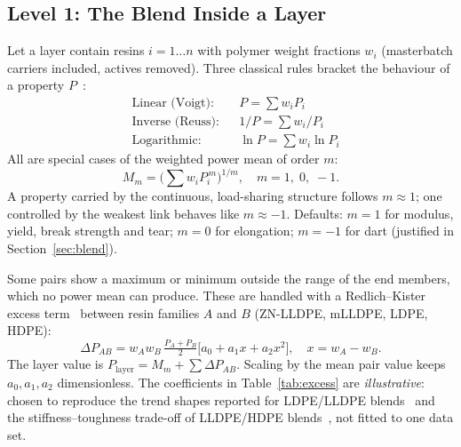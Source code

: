 \documentclass[conference,a4paper]{IEEEtran}
\begin{document}
\subsection{Level 1: The Blend Inside a Layer}
Let a layer contain resins $i=1\ldots n$ with polymer weight fractions $w_i$ (masterbatch carriers included, actives removed). Three classical rules bracket the behaviour of a property $P$~\cite{voigt}:
\begin{align}
&\text{Linear (Voigt):} && P=\textstyle\sum w_i P_i \label{eq:voigt}\\
&\text{Inverse (Reuss):} && 1/P=\textstyle\sum w_i/P_i \label{eq:reuss}\\
&\text{Logarithmic:} && \ln P=\textstyle\sum w_i \ln P_i \label{eq:log}
\end{align}
All are special cases of the weighted power mean of order $m$:
\begin{equation}
M_m=\Big(\textstyle\sum w_i P_i^{\,m}\Big)^{1/m},\quad m=1,\;0,\;-1. \label{eq:pm}
\end{equation}
A property carried by the continuous, load-sharing structure follows $m\approx1$; one controlled by the weakest link behaves like $m\approx-1$. Defaults: $m=1$ for modulus, yield, break strength and tear; $m=0$ for elongation; $m=-1$ for dart (justified in Section~\ref{sec:blend}).

Some pairs show a maximum or minimum outside the range of the end members, which no power mean can produce. These are handled with a Redlich--Kister excess term~\cite{rk} between resin families $A$ and $B$ (ZN-LLDPE, mLLDPE, LDPE, HDPE):
\begin{equation}
\Delta P_{AB}=w_Aw_B\,\tfrac{P_A+P_B}{2}\big[a_0+a_1x+a_2x^2\big],\quad x=w_A-w_B. \label{eq:rk}
\end{equation}
The layer value is $P_{\text{layer}}=M_m+\sum\Delta P_{AB}$. Scaling by the mean pair value keeps $a_0,a_1,a_2$ dimensionless. The coefficients in Table~\ref{tab:excess} are \emph{illustrative}: chosen to reproduce the trend shapes reported for LDPE/LLDPE blends~\cite{savar,jpfs} and the stiffness--toughness trade-off of LLDPE/HDPE blends~\cite{elkoun,us6355733}, not fitted to one data set.
\end{document}
